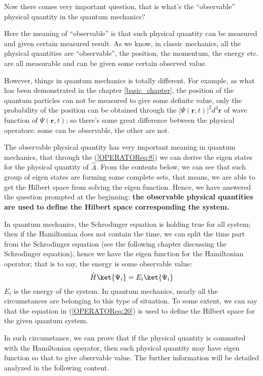 Now there comes very important question, that is what's the
``observable'' physical quantity in the quantum mechanics?

Here the meaning of ``observable'' is that such physical quantity can
be measured and given certain measured result. As we know, in classic
mechanics, all the physical quantities are ``observable'', the
position, the momentum, the energy etc. are all measurable and can be
given some certain observed value.

However, things in quantum mechanics is totally different. For
example, as what has been demonstrated in the chapter
\ref{basic_chapter}, the position of the quantum particles can not be
measured to give some definite value, only the probability of the
position can be obtained through the $|\Psi(\bm{r},
t)|^{2}d^{3}\bm{r}$ of wave function of $\Psi(\bm{r}, t)$; so there's
some great difference between the physical operators: some can be
observable, the other are not.

The observable physical quantity has very important meaning in quantum
mechanics, that through the (\ref{OPERATOReq:8}) we can derive the eigen
states for the physical quantity of $\hat{A}$. From the contents
below, we can see that such group of eigen states are forming some
complete sets, that means, we are able to get the Hilbert space from
solving the eigen function. Hence, we have answered the question
prompted at the beginning: \textbf{the observable physical quantities
  are used to define the Hilbert space corresponding the system.}

In quantum mechanics, the Schrodinger equation is holding true for all
system; then if the Hamiltonian does not contain the time, we can
split the time part from the Schrodinger equation (see the following
chapter discussing the Schrodinger equation), hence we have the eigen
function for the Hamiltonian operator; that is to say, the energy is
some observable value:
\begin{equation}
\label{OPERATOReq:20}
  \hat{H}\ket{\Psi_{i}} = E_{i} \ket{\Psi_{i}}
\end{equation}
$E_{i}$ is the energy of the system. In quantum mechanics, nearly all
the circumstances are belonging to this type of situation. To some
extent, we can say that the equation in (\ref{OPERATOReq:20}) is used
to define the Hilbert space for the given quantum system.

In such circumstance, we can prove that if the physical quantity is
commuted with the Hamiltonian operator, then such physical quantity
may have eigen function so that to give observable value. The further
information will be detailed analyzed in the following content.

